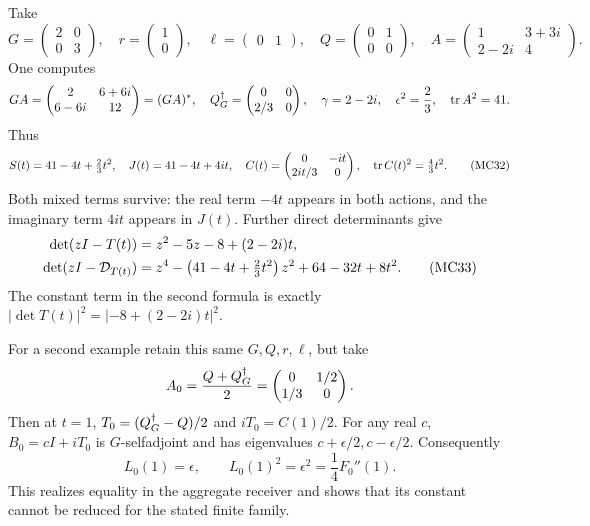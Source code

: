 Take
\begin{equation}
 G=\begin{pmatrix}2&0\\0&3\end{pmatrix},\quad
 r=\begin{pmatrix}1\\0\end{pmatrix},\quad
 \ell=\begin{pmatrix}0&1\end{pmatrix},\quad
 Q=\begin{pmatrix}0&1\\0&0\end{pmatrix},\quad
 A=\begin{pmatrix}1&3+3i\\2-2i&4\end{pmatrix}.
 \tag{MC31}\label{sam:MC31}
\end{equation}
One computes
\[
 GA=\begin{pmatrix}2&6+6i\\6-6i&12\end{pmatrix}=(GA)^*,
 \quad Q^\dagger_G=\begin{pmatrix}0&0\\2/3&0\end{pmatrix},
 \quad \gamma=2-2i,\quad \epsilon^2=\frac23,\quad\operatorname{tr} A^2=41.
\]
Thus
\begin{equation}
 S(t)=41-4t+\tfrac23t^2,\quad
 J(t)=41-4t+4it,\quad
 C(t)=\begin{pmatrix}0&-it\\2it/3&0\end{pmatrix},\quad
 \operatorname{tr} C(t)^2=\tfrac43t^2.
 \tag{MC32}\label{sam:MC32}
\end{equation}
Both mixed terms survive: the real term \(-4t\) appears in both
actions, and the imaginary term \(4it\) appears in \(J(t)\).
Further direct determinants give
\begin{align}
 \det(zI-T(t))&=z^2-5z-8+(2-2i)t,\notag\\
 \det(zI-\mathcal D_{T(t)})
 &=z^4-\left(41-4t+\tfrac23t^2\right)z^2
       +64-32t+8t^2.
 \tag{MC33}\label{sam:MC33}
\end{align}
The constant term in the second formula is exactly
\(|\det T(t)|^2=|-8+(2-2i)t|^2\).

For a second example retain this same \(G,Q,r,\ell\), but take
\[
 A_0=\frac{Q+Q^\dagger_G}{2}
   =\begin{pmatrix}0&1/2\\1/3&0\end{pmatrix}.
\]
Then at \(t=1\),
\(T_0=(Q^\dagger_G-Q)/2\) and \(iT_0=C(1)/2\).
For any real \(c\), \(B_0=cI+iT_0\) is \(G\)-selfadjoint and
has eigenvalues \(c+\epsilon/2,c-\epsilon/2\). Consequently
\begin{equation}
 L_0(1)=\epsilon,\qquad
 L_0(1)^2=\epsilon^2=\frac14F_0''(1).
 \tag{MC34}\label{sam:MC34}
\end{equation}
This realizes equality in the aggregate receiver and shows that its
constant cannot be reduced for the stated finite family.

